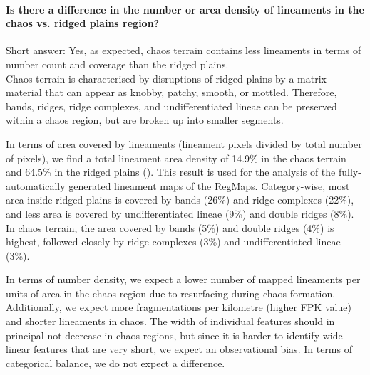 \paragraph{\textbf{Is there a difference in the number or area density of lineaments in the chaos vs. ridged plains region?}}\label{sec:Q1_numberdensity}
Short answer: Yes, as expected, chaos terrain contains less lineaments in terms of number count and coverage than the ridged plains.\\
Chaos terrain is characterised by disruptions of ridged plains by a matrix material that can appear as knobby, patchy, smooth, or mottled. Therefore, bands, ridges, ridge complexes, and undifferentiated lineae can be preserved within a chaos region, but are broken up into smaller segments. %

In terms of area covered by lineaments (lineament pixels divided by total number of pixels), we find a total lineament area density of 14.9\% in the chaos terrain and 64.5\% in the ridged plains (). This result is used for the analysis of the fully-automatically generated lineament maps of the RegMaps. Category-wise, most area inside ridged plains is covered by bands (26\%) and ridge complexes (22\%), and less area is covered by undifferentiated lineae (9\%) and double ridges (8\%). In chaos terrain, the area covered by bands (5\%) and double ridges (4\%) is highest, followed closely by ridge complexes (3\%) and undifferentiated lineae (3\%). 

In terms of number density, we expect a lower number of mapped lineaments per units of area in the chaos region due to resurfacing during chaos formation. Additionally, we expect more fragmentations per kilometre (higher FPK value) and shorter lineaments in chaos. The width of individual features should in principal not decrease in chaos regions, but since it is harder to identify wide linear features that are very short, we expect an observational bias. In terms of categorical balance, we do not expect a difference.


